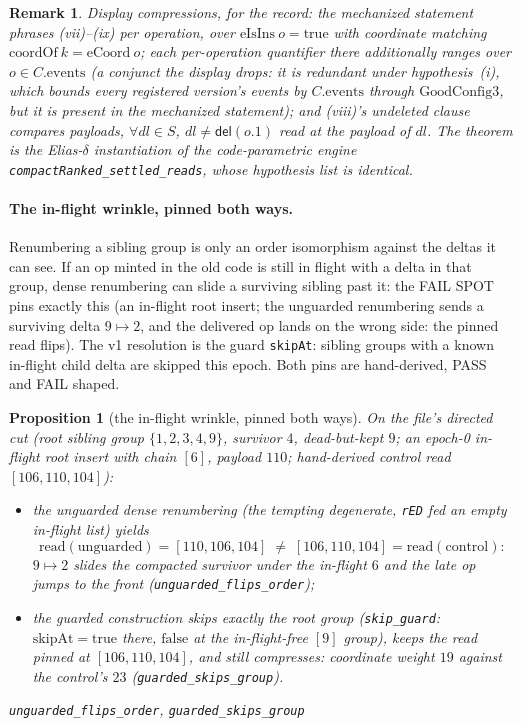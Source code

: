 \documentclass[11pt]{article}
\newtheorem{proposition}[theorem]{Proposition}
\newtheorem{remark}[theorem]{Remark}
\newcommand{\lean}[1]{\texttt{#1}}
\newcommand{\del}{\mathsf{del}}
\begin{document}
\begin{remark}
Display compressions, for the record: the mechanized statement phrases
(vii)--(ix) per operation, over $\mathrm{eIsIns}\ o = \mathrm{true}$
with coordinate matching $\mathrm{coordOf}\ k = \mathrm{eCoord}\ o$;
each per-operation quantifier there additionally ranges over $o \in
C.\mathrm{events}$ (a conjunct the display drops: it is redundant
under hypothesis~(i), which bounds every registered version's events
by $C.\mathrm{events}$ through $\mathrm{GoodConfig3}$, but it is
present in the mechanized statement); and (viii)'s undeleted clause
compares payloads, $\forall \mathit{dl} \in S$, $\mathit{dl} \neq
\del(o.1)$ read at the payload of $\mathit{dl}$. The theorem is the
Elias-$\delta$ instantiation of the code-parametric engine
\lean{compactRanked\_settled\_reads}, whose hypothesis list is
identical.
\end{remark}

\paragraph{The in-flight wrinkle, pinned both ways.} Renumbering a
sibling group is only an order isomorphism against the deltas it can
see. If an op minted in the old code is still in flight with a delta in
that group, dense renumbering can slide a surviving sibling past it:
the FAIL SPOT pins exactly this (an in-flight root insert; the
unguarded renumbering sends a surviving delta $9 \mapsto 2$, and the
delivered op lands on the wrong side: the pinned read flips). The v1
resolution is the guard \lean{skipAt}: sibling groups with a known
in-flight child delta are skipped this epoch. Both pins are
hand-derived, PASS and FAIL shaped.

\begin{proposition}[the in-flight wrinkle, pinned both ways]
\label{prop:inflight}
On the file's directed cut (root sibling group $\{1,2,3,4,9\}$,
survivor $4$, dead-but-kept $9$; an epoch-0 in-flight root insert with
chain $[6]$, payload $110$; hand-derived control read $[106, 110,
104]$):
\begin{itemize}[leftmargin=2em]
\item[FAIL] the \emph{unguarded} dense renumbering (the tempting
degenerate, \lean{rED} fed an empty in-flight list) yields
\[
  \mathrm{read}(\text{unguarded}) = [110, 106, 104] \;\neq\;
  [106, 110, 104] = \mathrm{read}(\text{control}) :
\]
$9 \mapsto 2$ slides the compacted survivor under the in-flight $6$
and the late op jumps to the front
(\lean{unguarded\_flips\_order});
\item[PASS] the \emph{guarded} construction skips exactly the root
group (\lean{skip\_guard}: $\mathrm{skipAt} = \mathrm{true}$ there,
$\mathrm{false}$ at the in-flight-free $[9]$ group), keeps the read
pinned at $[106, 110, 104]$, and still compresses: coordinate weight
$19$ against the control's $23$
(\lean{guarded\_skips\_group}).
\end{itemize}
\hfill\lean{unguarded\_flips\_order}, \lean{guarded\_skips\_group}
\end{proposition}
\end{document}
